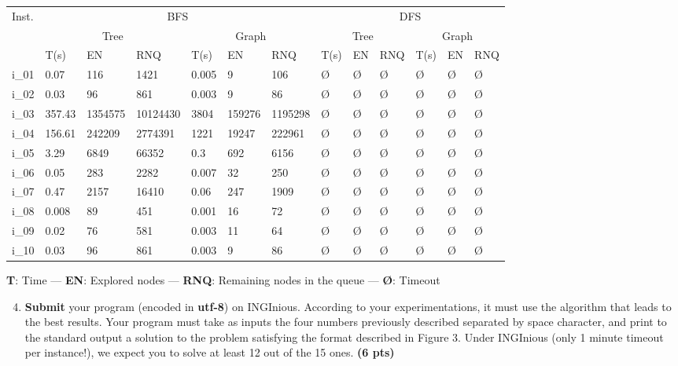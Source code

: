 \documentclass[11pt,a4paper]{../template/report}
\begin{document}
\begin{answers}[7cm]
\small
\begin{center}
\begin{tabular}{||l|l|l|l|l|l|l|l|l|l|l|l|l||}
\hline
\multirow{3}{*}{Inst.} & \multicolumn{6}{c|}{BFS} & \multicolumn{6}{c||}{DFS} \\
\cline{2-13}
& \multicolumn{3}{c|}{Tree} & \multicolumn{3}{c|}{Graph} & \multicolumn{3}{c|}{Tree} & \multicolumn{3}{c||}{Graph}\\
\cline{2-13}
 & T(s) & EN & RNQ & T(s) & EN & RNQ & T(s) & EN & RNQ & T(s) & EN & RNQ\\
\hline
i\_01 & 0.07 & 116 & 1421 & 0.005 & 9 & 106 & \O & \O & \O & \O & \O & \O \\
\hline
i\_02 & 0.03 & 96 & 861 & 0.003 & 9 & 86 & \O & \O & \O & \O & \O & \O \\
\hline
i\_03 & 357.43 & 1354575 & 10124430 & 3804 & 159276 & 1195298 & \O & \O & \O & \O & \O & \O \\
\hline
i\_04 & 156.61 & 242209 & 2774391 & 1221 & 19247 & 222961 & \O & \O & \O & \O & \O & \O \\
\hline
i\_05 & 3.29 & 6849 & 66352 & 0.3 & 692 & 6156 & \O & \O & \O & \O & \O & \O \\
\hline
i\_06 & 0.05 & 283 & 2282 & 0.007 & 32 & 250 & \O & \O & \O & \O & \O & \O \\
\hline
i\_07 & 0.47 & 2157 & 16410 & 0.06 & 247 & 1909 & \O & \O & \O & \O & \O & \O \\
\hline
i\_08 & 0.008 & 89 & 451 & 0.001 & 16 & 72 & \O & \O & \O & \O & \O & \O \\
\hline
i\_09 & 0.02 & 76 & 581 & 0.003 & 11 & 64 & \O & \O & \O & \O & \O & \O \\
\hline
i\_10 & 0.03 & 96 & 861 & 0.003 & 9 & 86 & \O & \O & \O & \O & \O & \O \\
\hline
\end{tabular}
\end{center}
\textbf{T}: Time — \textbf{EN}: Explored nodes —
\textbf{RNQ}: Remaining nodes in the queue — \textbf{\O}: Timeout
\end{answers}



\begin{enumerate}
\setcounter{enumi}{3}
    \item \textbf{Submit} your program (encoded in \textbf{utf-8}) on INGInious. According to your experimentations, it must use the algorithm that leads to the best results. Your program must take as inputs the four numbers previously described separated by space character, and print to the standard output a solution to the problem satisfying the format described in Figure 3. Under INGInious (only 1 minute timeout per instance!), we expect you to solve at least 12 out of the 15 ones. \textbf{(6 pts)}
\end{enumerate}
\end{document}
